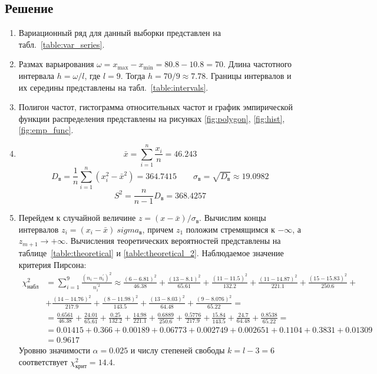 \documentclass{article}
\theoremstyle{problemstyle}
\begin{document}
\subsection{Решение}
\begin{enumerate}
  \item Вариационный ряд для данный выборки представлен на табл.~\ref{table:var_series}.
  \item Размах варьирования \(\omega = x_{\max} - x_{\min} = 80.8 - 10.8 = 70\).
    Длина частотного интервала \(h = \omega / l\), где \(l = 9\).
    Тогда \(h = 70/9 \approx 7.78\).
    Границы интервалов и их середины представлены на табл.~\ref{table:intervals}.
  \item Полигон частот, гистограмма относительных частот и
    график эмпирической функции распределения представлены на рисунках
    \ref{fig:polygon}, \ref{fig:hist}, \ref{fig:emp_func}.
  \item
    \[ \bar x = \sum_{i = 1}^n \frac{x_i}{n} = 46.243 \]
    \[
      D_\text{в} =
      \frac{1}{n} \sum_{i=1}^n \left( x_i^2 - \bar x^2 \right) =
      364.7415
      \qquad
      \sigma_\text{в} =
      \sqrt{D_\text{в}} \approx
      19.0982
    \]
    \[ S^2 = \frac{n}{n-1} D_\text{в} = 368.4257 \]
  \item Перейдем к случайной величине \(z = (x - \bar x) / \sigma_\text{в} \).
    Вычислим концы интервалов \(z_i = (x_i - \bar x) \ sigma_\text{в} \),
    причем $z_1$ положим стремящимся к $-\infty$, а $z_{m+1} \to +\infty$.
    Вычисления теоретических вероятностей представлены на таблице~\ref{table:theoretical} и \ref{table:theoretical_2}.
    Наблюдаемое значение критерия Пирсона:
    \begin{align*}
      \chi_\text{набл}^2 &= 
      \sum_{i=1}^9 \frac{(n_i - n^\prime_i)^2}{ n_i^{\prime2}} \approx
      \frac{(6 - 6.81)^2}{46.38} + \frac{(13 - 8.1)^2}{65.61} + \frac{(11 - 11.5)^2}{132.2} + \frac{(11 - 14.87)^2}{221.1} + \frac{(15 - 15.83)^2}{250.6} + \\ &+ \frac{(14 - 14.76)^2}{217.9} + \frac{(8 - 11.98)^2}{143.5} + \frac{(13 - 8.03)^2}{64.48} + \frac{(9 - 8.076)^2}{65.22} = \\
      &= \frac{0.6561}{46.38} + \frac{24.01}{65.61} + \frac{0.25}{132.2} + \frac{14.98}{221.1} + \frac{0.6889}{250.6} + \frac{0.5776}{217.9} + \frac{15.84}{143.5} + \frac{24.7}{64.48} + \frac{0.8538}{65.22} = \\
      &= 0.01415 + 0.366 + 0.00189 + 0.06773 + 0.002749 + 0.002651 + 0.1104 + 0.3831 + 0.01309 \\
      &= 0.9617
    \end{align*}
    Уровню значимости \(\alpha = 0.025\) и числу степеней свободы \(k = l - 3 = 6\) 
    соответствует $\chi^2_\text{крит} = 14.4 $.
    

\end{enumerate}
\end{document}
